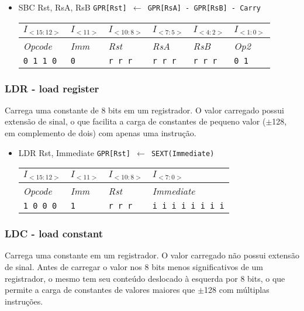 \documentclass{extreport}
\begin{document}
\begin{itemize}
\item SBC Rst, RsA, RsB
\subitem \texttt{GPR[Rst] $\leftarrow$ GPR[RsA] - GPR[RsB] - Carry}
\begin{table}[ht!]
\centering
\begin{tabular}{|p{1.6cm}|p{1.6cm}|p{1.6cm}|p{1.6cm}|p{1.6cm}|p{1.6cm}|}
\hline
$I_{<15:12>}$ & $I_{<11>}$ & $I_{<10:8>}$ & $I_{<7:5>}$ & $I_{<4:2>}$ & $I_{<1:0>}$ \\ \hline
\textit{Opcode} & \textit{Imm} & \textit{Rst} & \textit{RsA} & \textit{RsB} & \textit{Op2} \\ \hline
\texttt{0 1 1 0} & \texttt{0} & \texttt{r r r} & \texttt{r r r} & \texttt{r r r} & \texttt{0 1} \\ \hline
\end{tabular}
\end{table}
\end{itemize}

\subsubsection{LDR - load register}
Carrega uma constante de 8 bits em um registrador. O valor carregado possui extensão de sinal, o que facilita a carga de constantes de pequeno valor ($\pm$128, em complemento de dois) com apenas uma instrução.

\begin{itemize}
\item LDR Rst, Immediate
\subitem \texttt{GPR[Rst] $\leftarrow$ SEXT(Immediate)}
\begin{table}[ht!]
\centering
\begin{tabular}{|p{1.6cm}|p{1.6cm}|p{1.6cm}|p{5.65cm}|}
\hline
$I_{<15:12>}$ & $I_{<11>}$ & $I_{<10:8>}$ & $I_{<7:0>}$ \\ \hline
\textit{Opcode} & \textit{Imm} & \textit{Rst} & \textit{Immediate} \\ \hline
\texttt{1 0 0 0} & \texttt{1} & \texttt{r r r} & \texttt{i i i i i i i i} \\ \hline
\end{tabular}
\end{table}
\end{itemize}

\subsubsection{LDC - load constant}
Carrega uma constante em um registrador. O valor carregado não possui extensão de sinal. Antes de carregar o valor nos 8 bits menos significativos de um registrador, o mesmo tem seu conteúdo deslocado à esquerda por 8 bits, o que permite a carga de constantes de valores maiores que $\pm$128 com múltiplas instruções.
\end{document}

